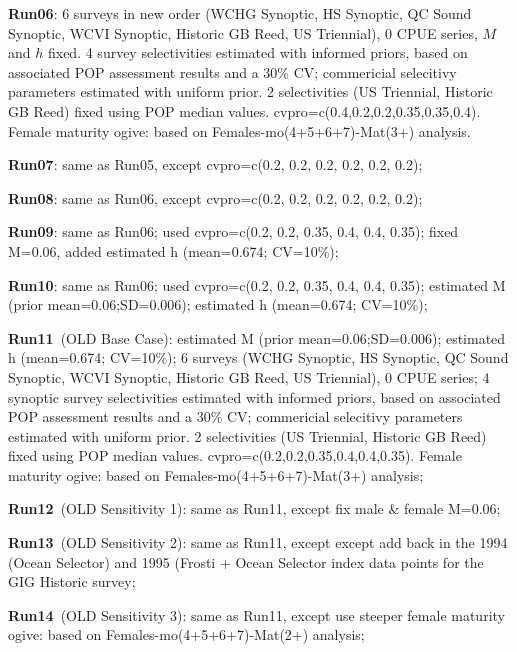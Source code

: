 {\bf Run06}: 6 surveys in new order (WCHG Synoptic, HS Synoptic, QC Sound Synoptic, WCVI Synoptic, Historic GB Reed, US Triennial), 0 CPUE series, $M$ and $h$ fixed. 4 survey selectivities estimated with informed priors, based on associated POP assessment results and a 30\% CV; commericial selecitivy parameters estimated with uniform prior. 2 selectivities (US Triennial,  Historic GB Reed) fixed using POP median values. cvpro=c(0.4,0.2,0.2,0.35,0.35,0.4).  Female maturity ogive: based on Females-mo(4+5+6+7)-Mat(3+) analysis. \newline  

{\bf Run07}: same as Run05, except cvpro=c(0.2, 0.2, 0.2, 0.2, 0.2, 0.2);  \newline

{\bf Run08}: same as Run06, except cvpro=c(0.2, 0.2, 0.2, 0.2, 0.2, 0.2);  \newline

{\bf Run09}: same as Run06; used cvpro=c(0.2, 0.2, 0.35, 0.4, 0.4, 0.35); fixed M=0.06, added estimated h (mean=0.674; CV=10\%); \newline

{\bf Run10}: same as Run06; used cvpro=c(0.2, 0.2, 0.35, 0.4, 0.4, 0.35); estimated M (prior mean=0.06;SD=0.006); estimated h (mean=0.674; CV=10\%); \newline

{\bf Run11}~(OLD Base Case): estimated M (prior mean=0.06;SD=0.006); estimated h (mean=0.674; CV=10\%); 6 surveys (WCHG Synoptic, HS Synoptic, QC Sound Synoptic, WCVI Synoptic, Historic GB Reed, US Triennial), 0 CPUE series; 4 synoptic survey selectivities estimated with informed priors, based on associated POP assessment results and a 30\% CV; commericial selecitivy parameters estimated with uniform prior. 2 selectivities (US Triennial,  Historic GB Reed) fixed using POP median values. cvpro=c(0.2,0.2,0.35,0.4,0.4,0.35).  Female maturity ogive: based on Females-mo(4+5+6+7)-Mat(3+) analysis; \newline 

{\bf Run12}~(OLD Sensitivity 1): same as Run11, except fix male \& female M=0.06; \newline

{\bf Run13}~(OLD Sensitivity 2): same as Run11, except except add back in the 1994 (Ocean Selector) and 1995 (Frosti + Ocean Selector index data points for the GIG Historic survey; \newline

{\bf Run14}~(OLD Sensitivity 3): same as Run11, except use steeper female maturity ogive: based on Females-mo(4+5+6+7)-Mat(2+) analysis; \newline

